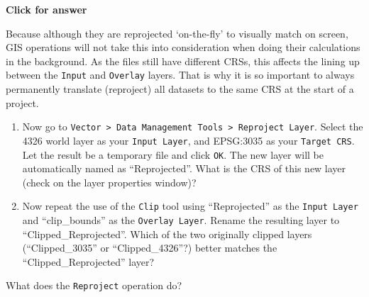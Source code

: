\documentclass[
  letterpaper,
  DIV=11,
  numbers=noendperiod]{scrreprt}
\begin{document}
\begin{tcolorbox}[enhanced jigsaw, leftrule=.75mm, colframe=quarto-callout-important-color-frame, breakable, toprule=.15mm, bottomrule=.15mm, arc=.35mm, rightrule=.15mm, opacityback=0, colback=white, left=2mm]

\vspace{-3mm}\textbf{Click for answer}\vspace{3mm}

Because although they are reprojected `on-the-fly' to visually match on
screen, GIS operations will not take this into consideration when doing
their calculations in the background. As the files still have different
CRSs, this affects the lining up between the \texttt{Input} and
\texttt{Overlay} layers. That is why it is so important to always
permanently translate (reproject) all datasets to the same CRS at the
start of a project.

\end{tcolorbox}

\begin{enumerate}
\def\labelenumi{(\arabic{enumi})}
\setcounter{enumi}{66}
\item
  Now go to
  \texttt{Vector\ \textgreater{}\ Data\ Management\ Tools\ \textgreater{}\ Reproject\ Layer}.
  Select the 4326 world layer as your \texttt{Input\ Layer}, and
  EPSG:3035 as your \texttt{Target\ CRS}. Let the result be a temporary
  file and click \texttt{OK}. The new layer will be automatically named
  as ``Reprojected''. What is the CRS of this new layer (check on the
  layer properties window)?
\item
  Now repeat the use of the \texttt{Clip} tool using ``Reprojected'' as
  the \texttt{Input\ Layer} and ``clip\_bounds'' as the
  \texttt{Overlay\ Layer}. Rename the resulting layer to
  ``Clipped\_Reprojected''. Which of the two originally clipped layers
  (``Clipped\_3035'' or ``Clipped\_4326''?) better matches the
  ``Clipped\_Reprojected'' layer?
\end{enumerate}

\begin{tcolorbox}[enhanced jigsaw, breakable, toptitle=1mm, colback=white, left=2mm, leftrule=.75mm, titlerule=0mm, colframe=quarto-callout-important-color-frame, opacityback=0, title=\textcolor{quarto-callout-important-color}{\faExclamation}\hspace{0.5em}{Stop and Think}, toprule=.15mm, opacitybacktitle=0.6, bottomtitle=1mm, colbacktitle=quarto-callout-important-color!10!white, bottomrule=.15mm, coltitle=black, rightrule=.15mm, arc=.35mm]

What does the \texttt{Reproject} operation do?

\end{tcolorbox}
\end{document}
